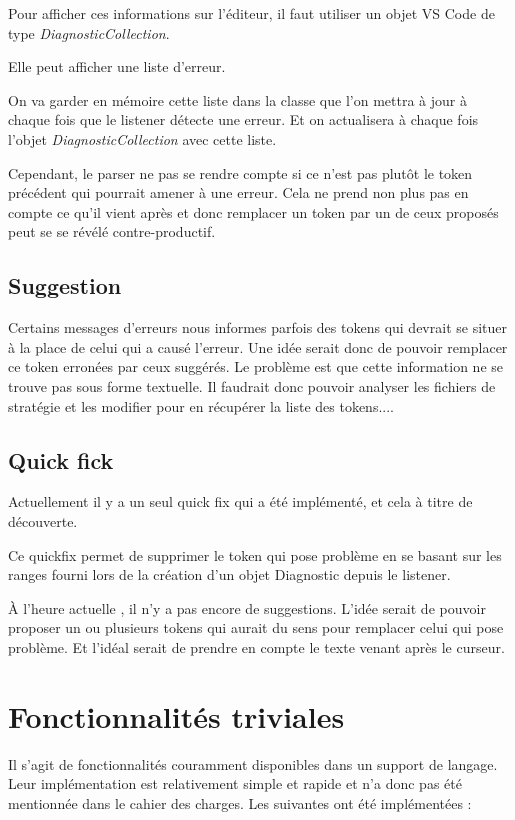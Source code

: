 \documentclass[
    iict, %
    il, %
]{heig-tb}
\begin{document}
Pour afficher ces informations sur l'éditeur, il faut utiliser un objet VS Code de type \emph{DiagnosticCollection}.

Elle peut afficher une liste d'erreur.

On va garder en mémoire cette liste dans la classe que l'on mettra à jour à chaque fois que le listener détecte une erreur.
Et on actualisera à chaque fois l'objet \emph{DiagnosticCollection} avec cette liste.

Cependant, le parser ne pas se rendre compte si ce n'est pas plutôt le token précédent qui pourrait amener à une erreur.
Cela ne prend non plus pas en compte ce qu'il vient après et donc remplacer un token par un de ceux proposés peut se se révélé contre-productif.

\subsection{Suggestion}
Certains messages d'erreurs nous informes parfois des tokens qui devrait se situer à la place de celui qui a causé l'erreur.
Une idée serait donc de pouvoir remplacer ce token erronées par ceux suggérés.
Le problème est que cette information ne se trouve pas sous forme textuelle.
Il faudrait donc pouvoir analyser les fichiers de stratégie et les modifier pour en récupérer la liste des tokens....


\subsection{Quick fick}


Actuellement il y a un seul quick fix qui a été implémenté, et cela à titre de découverte.

Ce quickfix permet de supprimer le token qui pose problème en se basant sur les ranges fourni lors de la création d'un objet Diagnostic depuis le listener.

À l'heure actuelle , il n'y a pas encore de suggestions. L'idée serait de pouvoir proposer un ou plusieurs tokens qui aurait du sens pour remplacer celui qui pose problème.
Et l'idéal serait de prendre en compte le texte venant après le curseur. %

\section{Fonctionnalités triviales}
Il s'agit de fonctionnalités couramment disponibles dans un support de langage. Leur implémentation est relativement simple et rapide et n'a donc pas été mentionnée dans le cahier des charges.
Les suivantes ont été implémentées :
\end{document}
